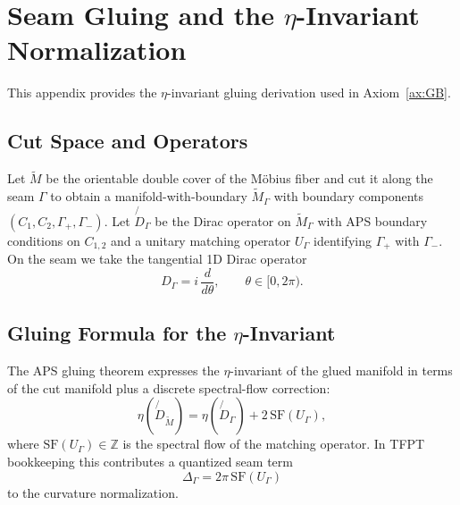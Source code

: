 \section{Seam Gluing and the $\eta$-Invariant Normalization}
\label{app:seam}

This appendix provides the $\eta$-invariant gluing derivation used in Axiom~\ref{ax:GB}.

\subsection{Cut Space and Operators}
Let $\widetilde{M}$ be the orientable double cover of the M\"obius fiber and cut it along
the seam $\Gamma$ to obtain a manifold-with-boundary $\widetilde{M}_\Gamma$ with
boundary components $(C_1,C_2,\Gamma_+,\Gamma_-)$. Let $\not{D}_\Gamma$ be the Dirac operator
on $\widetilde{M}_\Gamma$ with APS boundary conditions on $C_{1,2}$ and a unitary matching
operator $U_\Gamma$ identifying $\Gamma_+$ with $\Gamma_-$.
On the seam we take the tangential 1D Dirac operator
\begin{equation}
    D_\Gamma = i\,\frac{d}{d\theta}, \qquad \theta\in[0,2\pi).
\end{equation}

\subsection{Gluing Formula for the $\eta$-Invariant}
The APS gluing theorem expresses the $\eta$-invariant of the glued manifold in terms of
the cut manifold plus a discrete spectral-flow correction:
\begin{equation}
    \eta(\not{D}_{\widetilde{M}}) = \eta(\not{D}_\Gamma) + 2\,\mathrm{SF}(U_\Gamma),
\end{equation}
where $\mathrm{SF}(U_\Gamma)\in\mathbb{Z}$ is the spectral flow of the matching operator.
In TFPT bookkeeping this contributes a quantized seam term
\begin{equation}
    \Delta_\Gamma = 2\pi\,\mathrm{SF}(U_\Gamma)
\end{equation}
to the curvature normalization.


